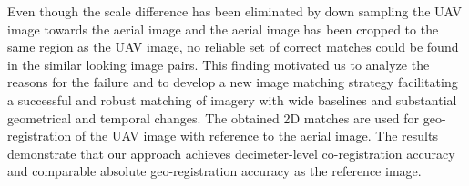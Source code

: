 Even though the scale difference has been eliminated by down sampling the UAV image towards the aerial image and the aerial image has been cropped to the same region as the UAV image, no reliable set of correct matches could be found in the similar looking image pairs. 
This finding motivated us to analyze the reasons for the failure and to develop a new image matching strategy facilitating a successful and robust matching of imagery with wide baselines and substantial geometrical and temporal changes.
The obtained 2D matches are used for geo-registration of the UAV image with reference to the aerial image.
The results demonstrate that our approach achieves decimeter-level co-registration accuracy and comparable absolute geo-registration accuracy as the reference image.

